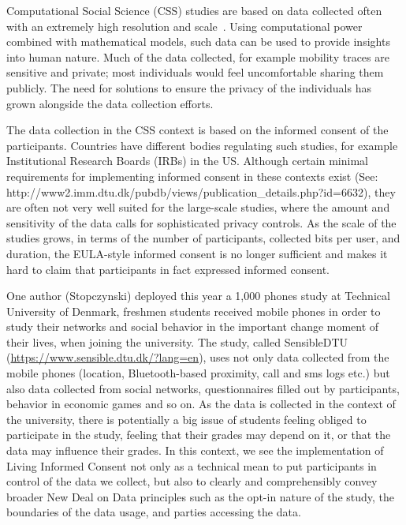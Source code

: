 Computational Social Science (CSS) studies are based on data collected often with an extremely high resolution and scale~\cite{lazer2009life}.
Using computational power combined with mathematical models, such data can be used to provide insights into human nature.
Much of the data collected, for example mobility traces are sensitive and private; most individuals would feel uncomfortable sharing them publicly.
The need for solutions to ensure the privacy of the individuals has grown alongside the data collection efforts.

The data collection in the CSS context is based on the informed consent of the participants. 
Countries have different bodies regulating such studies, for example Institutional Research Boards (IRBs) in the US. Although certain minimal requirements for implementing informed consent in these contexts exist (See: http://www2.imm.dtu.dk/pubdb/views/publication\_details.php?id=6632), they are often not very well suited for the large-scale studies, where the amount and sensitivity of the data calls for sophisticated privacy controls.
As the scale of the studies grows, in terms of the number of participants, collected bits per user, and duration, the EULA-style informed consent is no longer sufficient and makes it hard to claim that participants in fact expressed informed consent.

One author (Stopczynski) deployed this year a 1,000 phones study at Technical University of Denmark, freshmen students received mobile phones in order to study their networks and social behavior in the important change moment of their lives, when joining the university.
The study, called SensibleDTU (\url{https://www.sensible.dtu.dk/?lang=en}), uses not only data collected from the mobile phones (location, Bluetooth-based proximity, call and sms logs etc.) but also data collected from social networks, questionnaires filled out by participants, behavior in economic games and so on.
As the data is collected in the context of the university, there is potentially a big issue of students feeling obliged to participate in the study, feeling that their grades may depend on it, or that the data may influence their grades.
In this context, we see the implementation of Living Informed Consent not only as a technical mean to put participants in control of the data we collect, but also to clearly and comprehensibly convey broader New Deal on Data principles such as the opt-in nature of the study, the boundaries of the data usage, and parties accessing the data.

